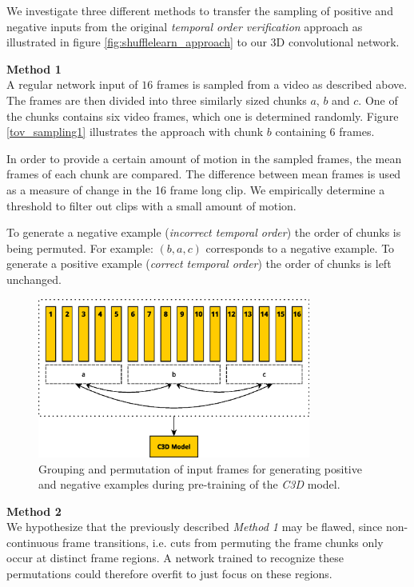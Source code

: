 We investigate three different methods to transfer the sampling of positive and negative inputs from the original \textit{temporal order verification} approach as illustrated in figure \ref{fig:shufflelearn_approach} to our 3D convolutional network.
\bigskip


\textbf{Method 1}\\
A regular network input of $16$ frames is sampled from a video as described above.
The frames are then divided into three similarly sized chunks $a$, $b$ and $c$.
One of the chunks contains six video frames, which one is determined randomly.
Figure \ref{tov_sampling1} illustrates the approach with chunk $b$ containing 6 frames.

In order to provide a certain amount of motion in the sampled frames, the mean frames of each chunk are compared.
The difference between mean frames is used as a measure of change in the 16 frame long clip.
We empirically determine a threshold to filter out clips with a small amount of motion.

To generate a negative example (\textit{incorrect temporal order}) the order of chunks is being permuted.
For example: $(b, a, c)$ corresponds to a negative example.
To generate a positive example (\textit{correct temporal order}) the order of chunks is left unchanged.

\begin{figure}[H]
    \centering
    \includegraphics[width=0.8\textwidth]{img_approach/tov_sampling1}
    \caption{Grouping and permutation of input frames for generating positive and negative examples during pre-training of the \textit{C3D} model.}
    \label{fig:tov_sampling1}
\end{figure}


\textbf{Method 2}\\
We hypothesize that the previously described \textit{Method 1} may be flawed, since non-continuous frame transitions, i.e. cuts from permuting the frame chunks only occur at distinct frame regions.
A network trained to recognize these permutations could therefore overfit to just focus on these regions.

